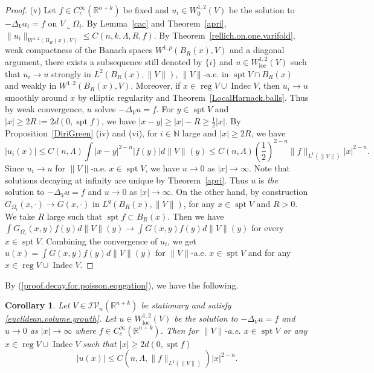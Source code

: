 \documentclass[11pt]{amsart}
\newtheorem{corollary}[theorem]{Corollary}
\theoremstyle{definition}
\newcommand{\R}{\mathbb{R}}
\newcommand{\N}{\mathbb{N}}
\newcommand{\IV}{\mathcal{IV}}
\newcommand{\loc}{\mathrm{loc}}
\DeclareMathOperator{\spt}{spt}
\DeclareMathOperator{\reg}{reg}
\DeclareMathOperator{\indec}{Indec}
\begin{document}
\begin{proof}
	
	(v) Let $f\in C_c^\infty (\R^{n+k})$ be fixed and $u_i\in W_0^{1,2}(V)$ be the solution to $-\Delta_V u_i=f$  on $V\llcorner \Omega_i$. By Lemma~\ref{cac} and Theorem~\ref{apri}, $\|u_i\|_{W^{1,2}( B_R(x),V)}\le C(n,k,\Lambda,R,f)$. By Theorem~\ref{rellich.on.one.varifold}, weak compactness of the Banach spaces $W^{1,p}( B_R(x),V)$ and a diagonal argument, there exists a subsequence still denoted by $\{i\}$ and $u\in W^{1,2}_\loc(V)$ such that $u_i\to u$ strongly in $L^2(B_R(x),\|V\|)$, $\|V\|$-a.e. in $\spt V\cap B_R(x)$ and weakly in $W^{1,2}( B_R(x),V)$. Moreover, if $x\in \reg V\cup \indec V$, then $u_i\to u$ smoothly around $x$ by elliptic regularity \cite{GT} and Theorem~\ref{LocalHarnack.balls}. Thus by weak convergence, $u$ solves $-\Delta_V u=f$. For $y\in \spt V$ and $|x|\ge 2R:=2d(0,\spt f)$, we have $|x-y|\ge |x|-R\ge \frac{1}{2}|x|$. By Proposition~\ref{DiriGreen} (iv) and (vi), for $i\in \N$ large and $|x|\ge 2R$, we have
	\begin{equation}\label{proof.decay.for.poisson.equgation}
		|u_i(x)|\le C(n,\Lambda)\int |x-y|^{2-n}|f(y)|d\|V\|(y)\le C(n,\Lambda)(\frac{1}{2})^{2-n}\|f\|_{L^1(\|V\|)}|x|^{2-n}.
	\end{equation}
	Since $u_i\to u$ for $\|V\|$-a.e. $x\in \spt V$, we have $u\to0$ as $|x|\to\infty$. Note that solutions decaying at infinity are unique by Theorem~\ref{apri}. Thus $u$ is \textit{the} solution to $-\Delta_V u=f$ and $u\to0$ as $|x|\to\infty$. On the other hand, by construction $G_{\Omega_i}(x,\cdot)\to G(x,\cdot)$ in $L^q(B_R(x),\|V\|)$, for any $x\in \spt V$ and 
	$R>0$. We take $R$ large such that $\spt f\subset B_R(x)$. Then we have $\int G_{\Omega_i}(x,y)f(y)d\|V\|(y)\to \int G(x,y)f(y)d\|V\|(y)$ for every $x\in \spt V$. Combining the convergence of $u_i$, we get $u(x)=\int G(x,y)f(y)d\|V\|(y)$ for $\|V\|$-a.e. $x\in \spt V$ and for any $x\in \reg V\cup \indec V$.
\end{proof}
By (\ref{proof.decay.for.poisson.equgation}), we have the following.
\begin{corollary}\label{decay.for.poisson.equgation}
	Let $V\in \IV_n(\R^{n+k})$ be stationary and satisfy \eqref{euclidean.volume.growth}. Let $u\in W_\loc^{1,2}(V)$ be the solution to $-\Delta_V u=f$ and $u\to0$ as $|x|\to\infty$ where $f\in C_c^\infty (\R^{n+k})$.
	Then for $\|V\|$-a.e. $x\in \spt V$ or any $x\in \reg V\cup \indec V$ such that $|x|\ge 2d(0,\spt f)$
	\[|u(x)|\le C(n,\Lambda,\|f\|_{L^1(\|V\|)})|x|^{2-n}.\]
\end{corollary}
\end{document}

